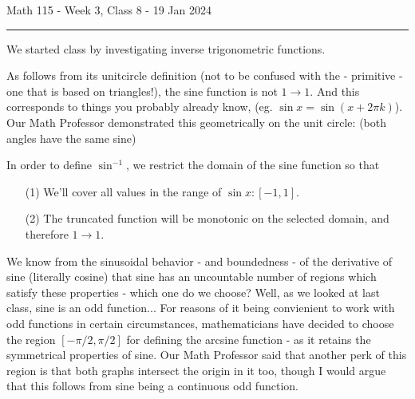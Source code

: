 \documentclass{article}
\begin{document}
Math 115 - Week 3, Class 8 - 19 Jan 2024
\hrule

\vspace{10pt}

We started class by investigating inverse trigonometric functions.

\vspace{10pt}

As follows from its unitcircle definition (not to be confused with the - primitive - one that is based on triangles!), the sine function is not $1\to1$. And this corresponds to things you probably already know, (eg. $\sin x=\sin(x+2\pi k)$). Our Math Professor demonstrated this geometrically on the unit circle: (both angles have the same sine)

\begin{center}
\end{center}

In order to define $\sin^{-1}$, we restrict the domain of the sine function so that

\begin{enumerate}
\item[(1)] We'll cover all values in the range of $\sin x:[-1,1]$.
\item[(2)] The truncated function will be monotonic on the selected domain, and therefore $1\to1$.
\end{enumerate}

We know from the sinusoidal behavior - and boundedness - of the derivative of sine (literally cosine) that sine has an uncountable number of regions which satisfy these properties - which one do we choose? Well, as we looked at last class, sine is an odd function... For reasons of it being convienient to work with odd functions in certain circumstances, mathematicians have decided to choose the region $[-\pi/2,\pi/2]$ for defining the arcsine function - as it retains the symmetrical properties of sine. Our Math Professor said that another perk of this region is that both graphs intersect the origin in it too, though I would argue that this follows from sine being a continuous odd function.
\end{document}
